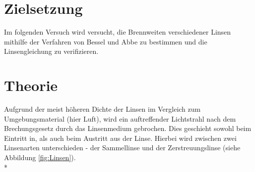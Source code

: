 \section{Zielsetzung}
Im folgenden Versuch wird versucht, die Brennweiten verschiedener Linsen mithilfe der Verfahren von Bessel und Abbe zu bestimmen und die Linsengleichung zu verifizieren.

\section{Theorie}
\label{Theorie}
Aufgrund der meist höheren Dichte der Linsen im Vergleich zum Umgebungsmaterial (hier Luft), wird ein auftreffender Lichtstrahl nach dem Brechungsgesetz durch das Linsenmedium gebrochen. Dies geschieht sowohl beim Eintritt in, als auch beim Austritt aus der Linse. Hierbei wird zwischen zwei Linsenarten unterschieden - der Sammellinse und der Zerstreuungslinse (siehe Abbildung \ref{fig:Linsen}). \\*

